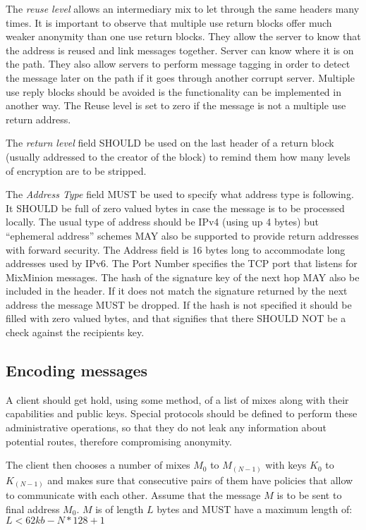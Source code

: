 \documentclass{article}
\begin{document}
The \emph{reuse level} allows an intermediary mix to let through the same
headers many times. It is important to observe that multiple use
return blocks offer much weaker anonymity than one use return
blocks. They allow the server to know that the address is reused and
link messages together. Server can know where it is on the path. They
also allow servers to perform message tagging in order to detect the
message later on the path if it goes through another corrupt
server. Multiple use reply blocks should be avoided is the
functionality can be implemented in another way. The Reuse level is
set to zero if the message is not a multiple use return address.

The \emph{return level} field SHOULD be used on the last header of a
return block (usually addressed to the creator of the block) to remind
them how many levels of encryption are to be stripped.

The \emph{Address Type} field MUST be used to specify what address type is
following. It SHOULD be full of zero valued bytes in case the message
is to be processed locally. The usual type of address should be IPv4
(using up 4 bytes) but ``ephemeral address'' schemes MAY also be
supported to provide return addresses with forward security. The
Address field is 16 bytes long to accommodate long addresses used by
IPv6. The Port Number specifies the TCP port that listens for
MixMinion messages. The hash of the signature key of the next hop MAY
also be included in the header. If it does not match the signature
returned by the next address the message MUST be dropped. If the hash
is not specified it should be filled with zero valued bytes, and that
signifies that there SHOULD NOT be a check against the recipients key.

\subsection{Encoding messages}

A client should get hold, using some method, of a list of mixes along with 
their capabilities and public keys. Special protocols should be defined to 
perform these administrative operations, so that they do not leak any 
information about potential routes, therefore compromising anonymity.

The client then chooses a number of mixes $M_0$ to $M_(N-1)$ with keys
$K_0$ to $K_(N-1)$ and makes sure that consecutive pairs of them have
policies that allow to communicate with each other. Assume that the
message $M$ is to be sent to final address $M_0$. $M$ is of length $L$
bytes and MUST have a maximum length of: \( L < 62kb - N*128 + 1 \)
\end{document}
